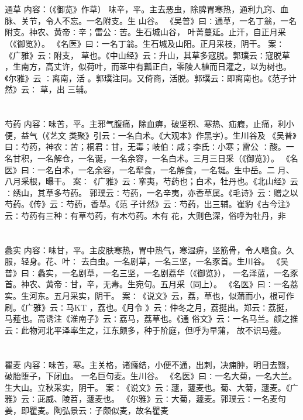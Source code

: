 \documentclass[12pt,UTF8]{ctexbook}
\begin{document}
\section{}通草
内容：（《御览》作草） 
味辛，平。主去恶虫，除脾胃寒热，通利九窍、血脉、关节，令人不忘。一名附支。生 
山谷。 
《吴普》曰∶通草，一名丁翁，一名附支。神农、黄帝∶辛；雷公∶苦。生石城山谷， 
叶菁蔓延。止汗，自正月采（《御览》）。 
《名医》曰∶一名丁翁。生石城及山阳。正月采枝，阴干。 
案∶《广雅》云∶附支， 草也。《中山经》云∶升山，其草多寇脱。郭璞云∶寇脱草 
，生南方，高丈许，似荷叶，而茎中有瓤正白，零陵人植而日灌之，以为树也。《尔雅》云 
∶离南，活 。郭璞注同。又倚商，活脱。郭璞云∶即离南也。《范子计然》云∶ 草，出 
三辅。 


\section{}芍药
内容：味苦，平。主邪气腹痛，除血痹，破坚积、寒热、疝瘕，止痛，利小便，益气（《艺文 
类聚》引云∶一名白术。《大观本》作黑字）。生川谷及 
《吴普》曰∶芍药，神农∶苦；桐君∶甘，无毒；岐伯∶咸；李氏∶小寒；雷公 
∶酸。一名甘积，一名解仓，一名诞，一名余容，一名白术。三月三日采（《御览》）。 
《名医》曰∶一名白术，一名余容，一名犁食，一名解食，一名铤。生中岳。二 
月、八月采根，曝干。 
案∶《广雅》云∶挛夷，芍药也；白术，牡丹也。《北山经》云∶绣山，其草多芍药。 
郭璞云∶芍药，一名辛夷，亦香草属。《毛诗》云∶赠之以芍药。《传》云∶芍药，香草。《范 
子计然》云∶芍药，出三辅。崔豹《古今注》云∶芍药有三种∶有草芍药，有木芍药。木有 
花，大则色深，俗呼为牡丹，非 


\section{}蠡实
内容：味甘，平。主皮肤寒热，胃中热气，寒湿痹，坚筋骨，令人嗜食。久服，轻身。花、叶∶ 
去白虫。一名剧草，一名三坚，一名豕首。生川谷。 
《吴普》曰∶蠡实，一名剧草，一名三坚，一名剧荔华（《御览》）， 
一名泽蓝，一名豕首。神农、黄帝∶甘，辛，无毒。生宛句。五月采（同上）。 
《名医》曰∶一名荔实。生河东。五月采实，阴干。 
案∶《说文》云，荔，草也，似蒲而小，根可作刷。《广雅》云∶马KT ，荔也。《月令 
》云∶仲冬之月，荔挺出。郑云∶荔挺，马薤也。高诱注《淮南子》云∶荔马，荔草也。《通 
俗文》云∶一名马兰。颜之推云∶此物河北平泽率生之，江东颇多，种于阶庭，但呼为早蒲， 
故不识马薤。 


\section{}瞿麦
内容：味苦，寒。主关格，诸癃结，小便不通，出刺，决痈肿，明目去翳，破胎堕子，下闭血。 
一名巨句麦。生川谷。 
《名医》曰∶一名大菊，一名大兰。生大山。立秋采实，阴干。 
案∶《说文》云∶蘧，蘧麦也。菊、大菊，蘧麦。《广雅》云∶茈威、陵苕，蘧麦也。 
《尔雅》云∶大菊，蘧麦。郭璞云∶一名麦句姜，即瞿麦。陶弘景云∶子颇似麦，故名瞿麦 
\end{document}
